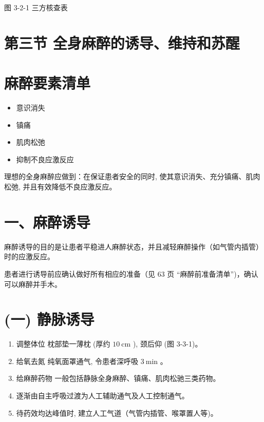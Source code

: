 \documentclass[10pt]{article}
\begin{document}
图 3-2-1 三方核查表

\section*{第三节 全身麻醉的诱导、维持和苏醒}
\section*{麻醉要素清单}
\begin{itemize}
  \item 意识消失
  \item 镇痛
  \item 肌肉松弛
  \item 抑制不良应激反应
\end{itemize}

理想的全身麻醉应做到：在保证患者安全的同时, 使其意识消失、充分镇痛、肌肉松弛, 并且有效降低不良应激反应。

\section*{一、麻醉诱导}
麻醉诱导的目的是让患者平稳进人麻醉状态，并且减轻麻醉操作（如气管内插管）时的应激反应。

患者进行诱导前应确认做好所有相应的准备（见 63 页 “麻醉前准备清单”)，确认可以麻醉并手木。

\section*{(一) 静脉诱导}
\begin{enumerate}
  \item 调整体位 枕部垫一薄枕 (厚约 $10 \mathrm{~cm}$ ), 颈后仰 (图 3-3-1)。

  \item 给氧去氮 纯氧面罩通气, 令患者深呼吸 $3 \mathrm{~min}$ 。

  \item 给麻醉药物 一般包括静脉全身麻醉、镇痛、肌肉松驰三类药物。

  \item 逐渐由自主呼吸过渡为人工辅助通气及人工控制通气。

  \item 待药效均达峰值时, 建立人工气道（气管内插管、喉罩置人等)。

\end{enumerate}
\end{document}
